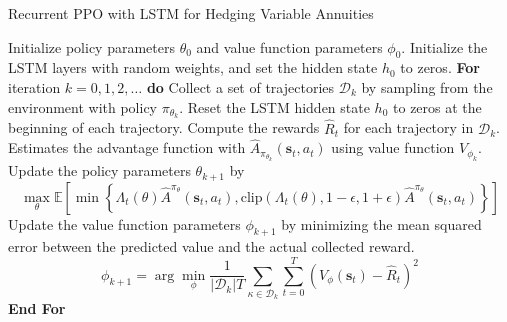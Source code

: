 \begin{algorithm}
    \caption{Recurrent PPO with LSTM for Hedging Variable Annuities} 
    \begin{algorithmic}[1] \label{alg3:ppoHedging-rnn}
        \STATE  Initialize policy parameters $\theta_0$ and value function parameters $\phi_0$.
        \STATE  Initialize the LSTM layers with random weights, and set the hidden state $h_0$ to zeros.
        \STATE  \textbf{For} {iteration $k=0, 1,2,\ldots$} \textbf{do}
        \STATE  \quad Collect a set of trajectories $\mathcal{D}_k$ by sampling from the environment with policy $\pi_{\theta_{k}}$.
        \STATE  \quad Reset the LSTM hidden state $h_0$ to zeros at the beginning of each trajectory.
        \STATE  \quad Compute the rewards $\hat{R}_t$ for each trajectory in $\mathcal{D}_k$.
        \STATE  \quad Estimates the advantage function with $\hat{A}_{\pi_{\theta_k}}(\mathbf{s}_t, a_t)$ using value function $V_{\phi_k}$.
        \STATE  \quad Update the policy parameters $\theta_{k+1}$ by 
        \begin{equation*}
            \max_{\theta} \mathbb{E}\left[ \min \left\{ \Lambda_t(\theta)\hat{A}^{\pi_{\theta}}(\mathbf{s}_t, a_t), \text{clip}(\Lambda_t(\theta), 1-\epsilon, 1 + \epsilon) \hat{A}^{\pi_{\theta}}(\mathbf{s}_t, a_t)  \right\} \right]
        \end{equation*}
        \STATE  \quad Update the value function parameters $\phi_{k+1}$ by minimizing the mean squared error between the predicted value and the actual collected reward.
        \begin{equation*}
            \phi_{k+1} = \arg \min_{\phi} \frac{1}{|\mathcal{D}_k|T} \sum_{\mathcal{\kappa} \in \mathcal{D}_k} \sum_{t=0}^{T} \left( V_{\phi}(\mathbf{s}_t) - \hat{R}_t \right)^2
        \end{equation*}
        \STATE  \textbf{End For}
    \end{algorithmic}
\end{algorithm}

